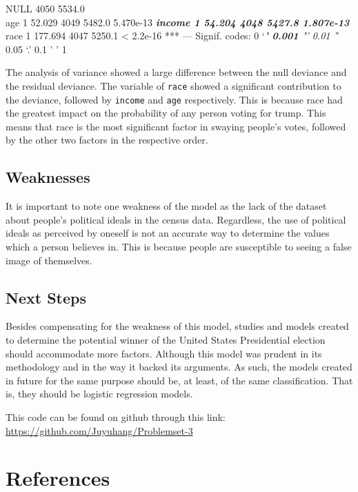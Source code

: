 \documentclass[
  12pt,
]{article}
\begin{document}
NULL 4050 5534.0\\
age 1 52.029 4049 5482.0 5.470e-13 \textbf{\emph{ income 1 54.204 4048
5427.8 1.807e-13 }} race 1 177.694 4047 5250.1 \textless{} 2.2e-16 ***
--- Signif. codes: 0 `\emph{\textbf{' 0.001 '}' 0.01 '}' 0.05 `.' 0.1 '
' 1

The analysis of variance showed a large difference between the null
deviance and the residual deviance. The variable of \texttt{race} showed
a significant contribution to the deviance, followed by \texttt{income}
and \texttt{age} respectively. This is because race had the greatest
impact on the probability of any person voting for trump. This means
that race is the most significant factor in swaying people's votes,
followed by the other two factors in the respective order.

\hypertarget{weaknesses}{%
\subsection{Weaknesses}\label{weaknesses}}

It is important to note one weakness of the model as the lack of the
dataset about people's political ideals in the census data. Regardless,
the use of political ideals as perceived by oneself is not an accurate
way to determine the values which a person believes in. This is because
people are susceptible to seeing a false image of themselves.

\hypertarget{next-steps}{%
\subsection{Next Steps}\label{next-steps}}

Besides compensating for the weakness of this model, studies and models
created to determine the potential winner of the United States
Presidential election should accommodate more factors. Although this
model was prudent in its methodology and in the way it backed its
arguments. As such, the models created in future for the same purpose
should be, at least, of the same classification. That is, they should be
logistic regression models.

This code can be found on github through this link:
\url{https://github.com/Juyuhang/Problemset-3}

\newpage

\hypertarget{references}{%
\section*{References}\label{references}}
\end{document}
